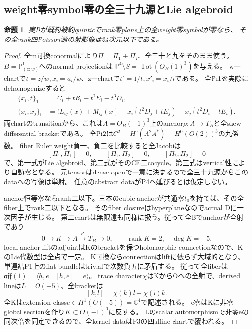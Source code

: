 \documentclass[a4paper,11pt]{ltjsarticle}
\newtheorem{proposition}{命題}[section]
\theoremstyle{definition}
\newcommand{\rank}{\operatorname{rank}}
\begin{document}
\subsection{weight零symbol零の全三十九源とLie algebroid}
\begin{proposition}\label{prop:plane-zero-symbol-algebroid-G}
実Dが既約被約quinticでrank零plane上の全weight零symbolが零なら、
その全rank四Poisson源の射影像は24次元以下である。
\end{proposition}
\begin{proof}
全m可換conormalにより$\Pi=\Pi_1+\Pi_2$、全三十と九をそのまま使う。
$B=\mathbb P^1_{(z:w)}$へのnormal projectionは
$\mathbb P^4\setminus S=\operatorname{Tot}(O_B(1)^3)$を与える。
w一chartで$t=z/w,x_i=a_i/w$、z一chartで$t'=1/t,x'_i=x_i/t$である。
全Pi1を実際にdehomogenizeすると
\[
\begin{aligned}
 \{x_i,t\}_1&=C_i+tB_i-t^2E_i-t^3D_i,\\
 \{x_i,x_j\}_1&=tL_{ij}(x)+M_{ij}(x)
   +x_i(t^2D_j+tE_j)-x_j(t^2D_i+tE_i).
\end{aligned}
\]
両chartのtransitionから、これは$A=O_B(-1)^3$上のanchor$\rho:A\to T_B$と全skew differential bracketである。
全Pi2は$C^2=H^0(\Lambda^2A^*)=H^0(O(2))^3$の九係数。
fiber Euler weight負一、負二を比較すると全Jacobiは
\[
 [\Pi_1,\Pi_1]=0,\qquad[\Pi_1,\Pi_2]=0,
 \qquad[\Pi_2,\Pi_2]=0
\]
で、第一式がLie algebroid、第二式がそのCE二cocycle、第三式はvertical性により自動零となる。
元tensorはdense openで一意に決まるので全三十九源からこのdataへの写像は単射。
任意のabstract dataがP4へ延びるとは仮定しない。

anchor恒等零ならrank二以下。三本のcubic anchorが共通零$t_0$を持てば、その全fiber上でrank二以下となる。
そのfiber closureはhyperplaneなのでactual Dに一次因子が生じる。
第二chartは無限遠も同様に扱う。従って全Bでanchorが全射であり
\[
 0\longrightarrow K\longrightarrow A\overset\rho\longrightarrow T_B\longrightarrow0,
 \qquad\rank K=2,\quad\deg K=-5.
\]
local anchor liftのadjointはKのbracketを保つholomorphic connectionなので、KのLie代数型は全点で一定。
K可換ならconnectionはliftに依らず大域的となり、単連結P1上のflat bundleはtrivialで次数負五に矛盾する。
従って全fiberは$\mathfrak{aff}(1)=\langle h,e\mid[h,e]=e\rangle$。
trace character$\chi$はKからOへの全射で、derived lineは$L=O(-5)$、全bracketは
\[
 [k,l]=\chi(k)l-\chi(l)k.
\]
全Kはextension class$e\in H^1(O(-5))=\mathbb C^4$で記述される。
e零はKに非零global sectionを作り$K\subset O(-1)^3$に反する。
Lのscalar automorphismで非零eの同次倍を同定できるので、全kernel dataはP3の四affine chartで覆われる。


\end{proof}
\end{document}
